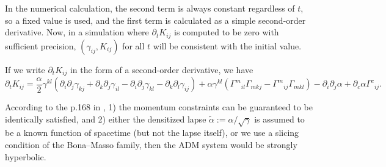 \documentclass{article}
\begin{document}
	In the numerical calculation, the second term is always constant regardless of $t$, so a fixed value is used, and the first term is calculated as a simple second-order derivative. Now, in a simulation where $\partial_t K_{ij}$ is computed to be zero with sufficient precision, $(\gamma_{ij}, K_{ij})$ for all $t$ will be consistent with the initial value.
	
	If we write $\partial_t K_{ij}$ in the form of a second-order derivative, we have
	\begin{equation}
		\partial_t K_{ij} = \frac{\alpha}{2}\gamma^{kl}(\partial_i\partial_j \gamma_{kj} + \partial_k \partial_j \gamma_{il} - \partial_i \partial_j \gamma_{kl} - \partial_k \partial_l \gamma_{ij}) + \alpha \gamma^{kl}(\Gamma^m{}_{il} \Gamma_{mkj} - \Gamma^m{}_{ij} \Gamma_{mkl})- \partial_i \partial_j \alpha + \partial_c \alpha \Gamma^c{}_{ij}.
	\end{equation}
	
	According to the p.168 in \cite{alcubierre2008introduction}, 1) the momentum constraints can
	be guaranteed to be identically satisfied, and 2) either the densitized lapse $\tilde{\alpha} := \alpha / \sqrt{\gamma}$ is
	assumed to be a known function of spacetime (but not the lapse itself), or we
	use a slicing condition of the Bona–Masso family, then the ADM system would
	be strongly hyperbolic. 

	
	
\end{document}
